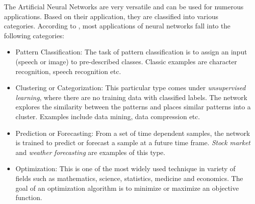The Artificial Neural Networks are very versatile and can be used for numerous applications. Based on their application, they are classified into various categories. According to \citet{jain1996artificial},  most applications of neural networks fall into the following categories:\\
\begin{itemize}
\item Pattern Classification: The task of pattern classification is to assign an input (speech or image) to pre-described classes. Classic examples are character recognition, speech recognition etc. 
\item Clustering or Categorization: This particular type comes under \textit{unsupervised learning}, where there are no training data with classified labels. The network explores the similarity between the patterns and places similar patterns into a cluster. Examples include data mining, data compression etc.
\item Prediction or Forecasting: From a set of time dependent samples, the network is trained to predict or forecast a sample at a future time frame. \textit{Stock market} and \textit{weather forecasting} are examples of this type.
\item Optimization: This is one of the most widely used technique in variety of fields such as mathematics, science, statistics, medicine and economics. The goal of an optimization algorithm is to minimize or maximize an objective function.
\end{itemize}
